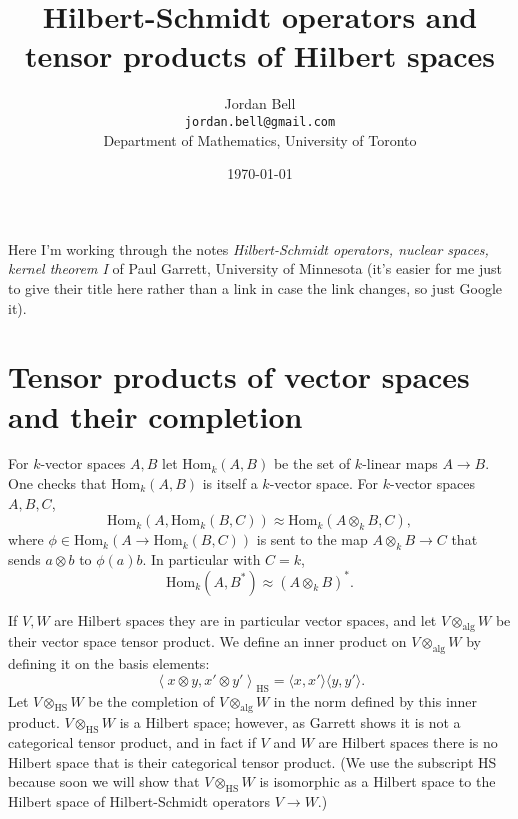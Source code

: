 \documentclass{article}
\newcommand{\HSinner}[2]{\left\langle #1, #2 \right\rangle_{\textrm{HS}}}
\newcommand{\inner}[2]{\langle #1, #2 \rangle}
\newcommand{\alg}{\otimes_{\textrm{alg}}}
\newcommand{\HS}{\otimes_{\textrm{HS}}}
\newcommand{\Hom}{\textrm{Hom}}
\begin{document}
\title{Hilbert-Schmidt operators and tensor products of Hilbert spaces}
\author{Jordan Bell\\ \texttt{jordan.bell@gmail.com}\\Department of Mathematics, University of Toronto}
\date{\today}

\maketitle

Here I'm working through  the notes {\em Hilbert-Schmidt operators, nuclear spaces, kernel theorem I} of Paul Garrett, University of
Minnesota (it's easier for me just to give their title here rather than a link in case the link changes, so just Google it).

\section{Tensor products of vector spaces and their completion}
For $k$-vector spaces $A,B$ let $\Hom_k(A,B)$ be the set of $k$-linear maps $A \to B$. 
One checks that $\Hom_k(A,B)$ is itself a $k$-vector space.
For $k$-vector spaces $A,B,C$,
\[
\Hom_k(A,\Hom_k(B,C)) \approx \Hom_k(A \otimes_k B, C), 
\]
where $\phi \in \Hom_k(A \to \Hom_k(B,C))$ is sent to the map $A \otimes_k B \to C$ that sends
$a \otimes b$ to $\phi(a)b$.
In particular with $C=k$,
\[
\Hom_k(A,B^*) \approx (A \otimes_k B)^*.
\]

If $V,W$ are Hilbert spaces they are in particular vector spaces, and let $V \alg W$ be their vector space tensor product. We  define an inner product on 
 $V \alg W$ by defining it on the basis elements:
\[
\HSinner{x \otimes y}{x' \otimes y'}=\inner{x}{x'} \inner{y}{y'}.
\]
Let $V \HS W$ be the completion of $V \alg W$ in the norm defined by this inner product. 
$V \HS W$ is a Hilbert space; however, as Garrett shows it is not
a categorical tensor product, and in fact if $V$ and $W$ are Hilbert spaces there is no Hilbert space that is their categorical tensor product.
(We use the subscript HS because soon we will show that $V \HS W$ is isomorphic as a Hilbert space to 
the Hilbert space of Hilbert-Schmidt operators $V \to W$.)
\end{document}
